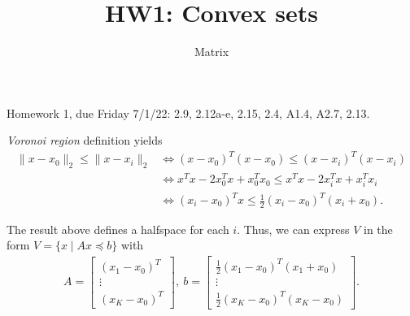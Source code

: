 \documentclass[12pt]{article}
\title{HW1: Convex sets}
\author{Matrix}
\begin{document}
\maketitle

Homework 1, due Friday 7/1/22:  2.9, 2.12a-e, 2.15, 2.4, A1.4, A2.7, 2.13.

\begin{solution}[2.9(a)]

	\textit{Voronoi region} definition yields
    \begin{align*}
			\|x-x_0\|_2\le \|x-x_i\|_2 & \Longleftrightarrow (x-x_0)^T(x-x_0) \le (x-x_i)^T(x-x_i) \\
															 &\Longleftrightarrow x^Tx-2x_0^Tx+x_0^Tx_0\le x^Tx-2x_{i}^Tx+x_{i}^Tx_{i}\\
															 &\Longleftrightarrow (x_i-x_0)^Tx \le \frac{1}{2}(x_i-x_0)^T(x_i+x_0)
    .\end{align*}
		
		The result above defines a halfspace for each $i$. Thus, we can express  $V$ in the form  $V=\{ x \mid Ax \preceq b\}$ with
		\begin{align*}
			A = \begin{bmatrix} (x_{1}-x_0)^T \\ \vdots \\ (x_{K}-x_0)^T \end{bmatrix} ,\ b=\begin{bmatrix} \frac{1}{2}(x_1-x_0)^T(x_1+x_0) \\ \vdots \\ \frac{1}{2}(x_K-x_0)^T(x_K-x_0) \end{bmatrix} 
		.\end{align*}

\end{solution}
\end{document}
